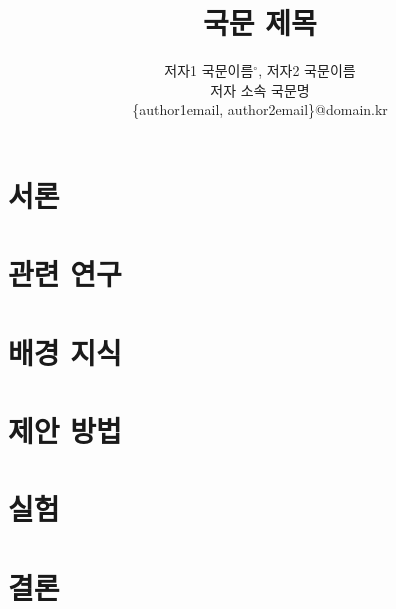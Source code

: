 \documentclass[preprint]{kcc} %
\title{국문 제목}
\author{
저자1 국문이름$^{\circ}$, 저자2 국문이름\\
저자 소속 국문명 \\
\{author1email, author2email\}@domain.kr
}
\begin{document}
\maketitle

\section{서론}


\section{관련 연구}


\section{배경 지식}


\section{제안 방법}


\section{실험}


\section{결론}





\newpage
\appendix

\end{document}
